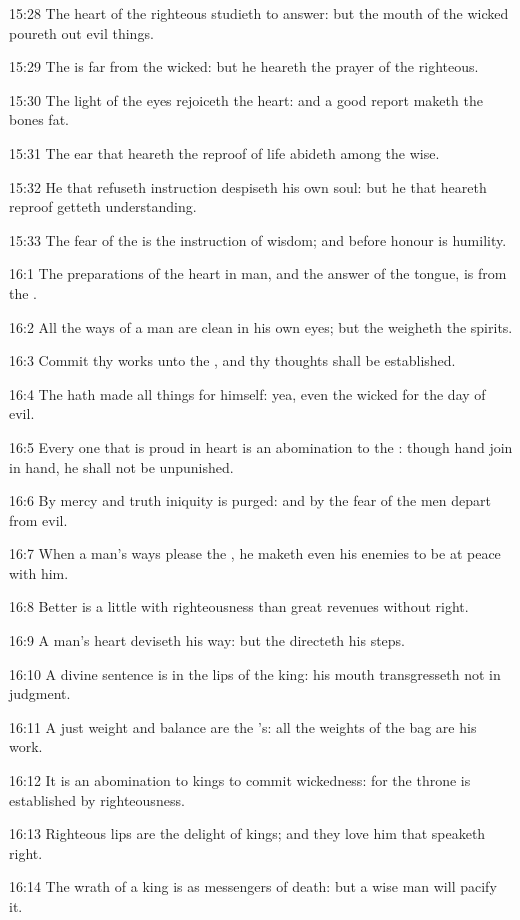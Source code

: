 15:28 The heart of the righteous studieth to answer: but the mouth of
the wicked poureth out evil things.

15:29 The \LORD is far from the wicked: but he heareth the prayer of
the righteous.

15:30 The light of the eyes rejoiceth the heart: and a good report
maketh the bones fat.

15:31 The ear that heareth the reproof of life abideth among the wise.

15:32 He that refuseth instruction despiseth his own soul: but he that
heareth reproof getteth understanding.

15:33 The fear of the \LORD is the instruction of wisdom; and before
honour is humility.

16:1 The preparations of the heart in man, and the answer of the
tongue, is from the \LORD.

16:2 All the ways of a man are clean in his own eyes; but the \LORD
weigheth the spirits.

16:3 Commit thy works unto the \LORD, and thy thoughts shall be
established.

16:4 The \LORD hath made all things for himself: yea, even the wicked
for the day of evil.

16:5 Every one that is proud in heart is an abomination to the \LORD:
though hand join in hand, he shall not be unpunished.

16:6 By mercy and truth iniquity is purged: and by the fear of the
\LORD men depart from evil.

16:7 When a man's ways please the \LORD, he maketh even his enemies to
be at peace with him.

16:8 Better is a little with righteousness than great revenues without
right.

16:9 A man's heart deviseth his way: but the \LORD directeth his steps.

16:10 A divine sentence is in the lips of the king: his mouth
transgresseth not in judgment.

16:11 A just weight and balance are the \LORD's: all the weights of the
bag are his work.

16:12 It is an abomination to kings to commit wickedness: for the
throne is established by righteousness.

16:13 Righteous lips are the delight of kings; and they love him that
speaketh right.

16:14 The wrath of a king is as messengers of death: but a wise man
will pacify it.

